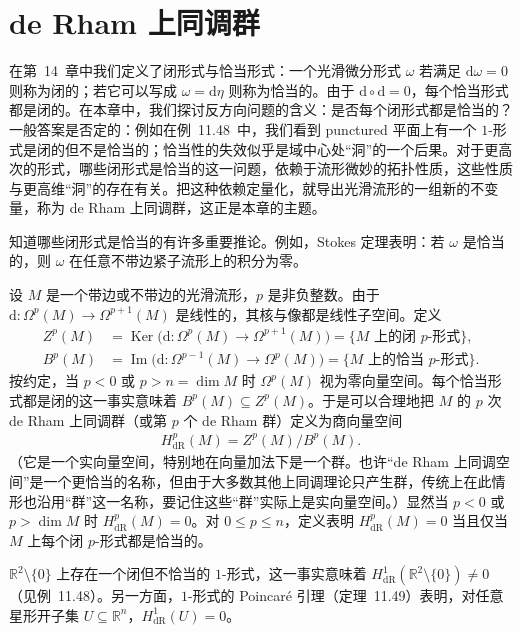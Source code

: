 \documentclass[../../main.tex]{subfiles}
\begin{document}
\section{de Rham 上同调群}\label{section:ch17-the-de-rham-cohomology-groups}

在第~14~章中我们定义了闭形式与恰当形式：一个光滑微分形式 $\omega$ 若满足 $\mathrm{d}\omega=0$ 则称为闭的；若它可以写成 $\omega=\mathrm{d}\eta$ 则称为恰当的。由于 $\mathrm{d}\circ\mathrm{d}=0$，每个恰当形式都是闭的。在本章中，我们探讨反方向问题的含义：是否每个闭形式都是恰当的？一般答案是否定的：例如在例~11.48~中，我们看到 punctured 平面上有一个 $1$-形式是闭的但不是恰当的；恰当性的失效似乎是域中心处“洞”的一个后果。对于更高次的形式，哪些闭形式是恰当的这一问题，依赖于流形微妙的拓扑性质，这些性质与更高维“洞”的存在有关。把这种依赖定量化，就导出光滑流形的一组新的不变量，称为 de Rham 上同调群，这正是本章的主题。

知道哪些闭形式是恰当的有许多重要推论。例如，Stokes 定理表明：若 $\omega$ 是恰当的，则 $\omega$ 在任意不带边紧子流形上的积分为零。

设 $M$ 是一个带边或不带边的光滑流形，$p$ 是非负整数。由于 $\mathrm{d}:\Omega^p(M)\to\Omega^{p+1}(M)$ 是线性的，其核与像都是线性子空间。定义
\begin{align*}
Z^p(M)&=\operatorname{Ker}\bigl(\mathrm{d}:\Omega^p(M)\to\Omega^{p+1}(M)\bigr)=\{M\text{ 上的闭 }p\text{-形式}\},\\
B^p(M)&=\operatorname{Im}\bigl(\mathrm{d}:\Omega^{p-1}(M)\to\Omega^p(M)\bigr)=\{M\text{ 上的恰当 }p\text{-形式}\}.
\end{align*}
按约定，当 $p<0$ 或 $p>n=\dim M$ 时 $\Omega^p(M)$ 视为零向量空间。每个恰当形式都是闭的这一事实意味着 $B^p(M)\subseteq Z^p(M)$。于是可以合理地把 $M$ 的 $p$ 次 de Rham 上同调群（或第 $p$ 个 de Rham 群）定义为商向量空间
\begin{align}
H^p_{\mathrm{dR}}(M)=Z^p(M)/B^p(M).
\end{align}
（它是一个实向量空间，特别地在向量加法下是一个群。也许“de Rham 上同调空间”是一个更恰当的名称，但由于大多数其他上同调理论只产生群，传统上在此情形也沿用“群”这一名称，要记住这些“群”实际上是实向量空间。）显然当 $p<0$ 或 $p>\dim M$ 时 $H^p_{\mathrm{dR}}(M)=0$。对 $0\leqslant p\leqslant n$，定义表明 $H^p_{\mathrm{dR}}(M)=0$ 当且仅当 $M$ 上每个闭 $p$-形式都是恰当的。

\begin{example}\label{example:ch17-punctured-plane-not-exact}
$\mathbb{R}^2\setminus\{0\}$ 上存在一个闭但不恰当的 $1$-形式，这一事实意味着 $H^1_{\mathrm{dR}}(\mathbb{R}^2\setminus\{0\})\neq0$（见例~11.48）。另一方面，$1$-形式的 Poincaré 引理（定理~11.49）表明，对任意星形开子集 $U\subseteq\mathbb{R}^n$，$H^1_{\mathrm{dR}}(U)=0$。
\end{example}
\end{document}
